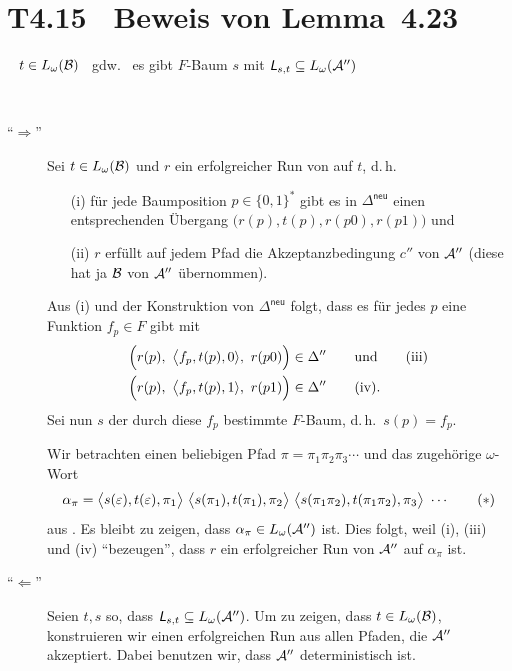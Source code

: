 \documentclass[fontsize=11pt, twoside=false, numbers=autoenddot]{scrbook}
\begin{document}
\goodbreak
\section*{T4.15~ Beweis von Lemma~4.23}

~
$t \in L_\omega(\mathcal{B})$
~gdw.~
es gibt $F$-Baum $s$ mit $\textsf{\textit{L}}_{s,t} \subseteq L_\omega(\mathcal{A}'')$

\par\medskip
{}~
\begin{description}
  \item[{\boldmath"`$\Rightarrow$"'}]
    Sei $t \in L_\omega(\mathcal{B})$ und $r$ ein erfolgreicher Run von \Bmc auf $t$,
    d.\,h.
    \begin{itemize}
      \item[(i)] 
        für jede Baumposition $p \in \{0,1\}^*$ gibt es in $\Delta^{\textsf{neu}}$
        einen entsprechenden Übergang $\big(r(p),t(p),r(p0),r(p1)\big)$ \qquad und
      \item[(ii)]
        $r$ erfüllt auf jedem Pfad die Akzeptanzbedingung
        $c''$ von $\mathcal{A}''$ (diese hat ja $\mathcal{B}$ von $\mathcal{A}''$ übernommen).
    \end{itemize}
    Aus (i) und der Konstruktion von $\Delta^{\textsf{neu}}$ folgt,
    dass es für jedes $p$ eine Funktion $f_p \in F$ gibt mit
    \begin{align*}
      \Big(r(p),~ \big\langle f_p,t(p),0\rangle,~ r(p0)\Big) & \in \Delta''\qquad\text{und} \tag{iii}\\
      \Big(r(p),~ \big\langle f_p,t(p),1\rangle,~ r(p1)\Big) & \in \Delta'' \tag{iv}.
    \end{align*}
    Sei nun $s$ der durch diese $f_p$ bestimmte $F$-Baum,
    d.\,h.\ $s(p) = f_p$.
    
    Wir betrachten einen beliebigen Pfad $\pi = \pi_1\pi_2\pi_3\cdots$
    und das zugehörige $\omega$-Wort
    \[
      \alpha_\pi = 
      \big\langle s(\varepsilon),t(\varepsilon),\pi_1\big\rangle~
      \big\langle s(\pi_1),t(\pi_1),\pi_2\big\rangle~
      \big\langle s(\pi_1\pi_2),t(\pi_1\pi_2),\pi_3\big\rangle~
      \cdots
      \tag{$*$}
    \]
    aus \Lst.
    Es bleibt zu zeigen, dass $\alpha_\pi \in L_\omega(\mathcal{A}'')$ ist.
    Dies folgt, weil (i), (iii) und (iv) "`bezeugen"', dass $r$
    ein erfolgreicher Run von $\mathcal{A}''$ auf $\alpha_\pi$ ist.
    \par\medskip
  \item[{\boldmath"`$\Leftarrow$"'}]
    Seien $t,s$ so, dass $\textsf{\textit{L}}_{s,t} \subseteq L_\omega(\mathcal{A}'')$.
    Um zu zeigen, dass $t \in L_\omega(\mathcal{B})$, konstruieren wir einen
    erfolgreichen Run aus allen Pfaden, die $\mathcal{A}''$ akzeptiert.
    Dabei benutzen wir, dass $\mathcal{A}''$ deterministisch ist.
    

\end{description}
\end{document}

